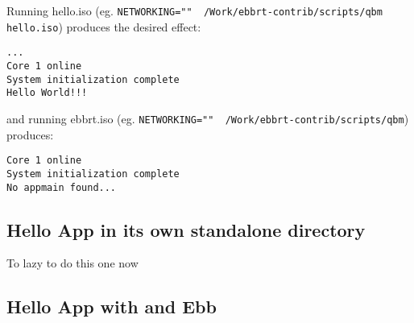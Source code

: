 \documentclass[11pt]{report}
\begin{document}
Running hello.iso (eg. {\tt NETWORKING="" ~/Work/ebbrt-contrib/scripts/qbm hello.iso}) produces the desired effect:
\begin{verbatim}
...
Core 1 online
System initialization complete
Hello World!!!
\end{verbatim}

and running ebbrt.iso (eg. {\tt NETWORKING="" ~/Work/ebbrt-contrib/scripts/qbm})
produces:
\begin{verbatim}
Core 1 online
System initialization complete
No appmain found...
\end{verbatim}

\subsection{Hello App in its own standalone directory}
To lazy to do this one now

\subsection{Hello App with and Ebb}







 
\end{document}
